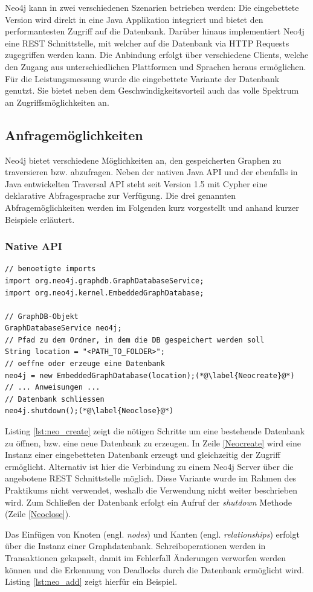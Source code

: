 \documentclass[11pt, a4paper, oneside]{article} %
\begin{document}
Neo4j kann in zwei verschiedenen Szenarien betrieben werden: Die eingebettete Version wird direkt in eine Java Applikation integriert und bietet den performantesten Zugriff auf die Datenbank. Darüber hinaus implementiert Neo4j eine REST Schnittstelle, mit welcher auf die Datenbank via HTTP Requests zugegriffen werden kann. Die Anbindung erfolgt über verschiedene Clients, welche den Zugang aus unterschiedlichen Plattformen und Sprachen heraus ermöglichen.\\
Für die Leistungsmessung wurde die eingebettete Variante der Datenbank genutzt. Sie bietet neben dem Geschwindigkeitsvorteil auch das volle Spektrum an Zugriffsmöglichkeiten an.

\subsection{Anfragemöglichkeiten}

Neo4j bietet verschiedene Möglichkeiten an, den gespeicherten Graphen zu traversieren bzw. abzufragen. Neben der nativen Java API und der ebenfalls in Java entwickelten Traversal API steht seit Version 1.5 mit Cypher eine deklarative Abfragesprache zur Verfügung. Die drei genannten Abfragemöglichkeiten werden im Folgenden kurz vorgestellt und anhand kurzer Beispiele erläutert.

\subsubsection{Native API}

\begin{lstlisting}[caption={Erstellen, Öffnen und Schließen einer Datenbank},label={lst:neo_create}]
// benoetigte imports
import org.neo4j.graphdb.GraphDatabaseService;
import org.neo4j.kernel.EmbeddedGraphDatabase;

// GraphDB-Objekt
GraphDatabaseService neo4j;
// Pfad zu dem Ordner, in dem die DB gespeichert werden soll
String location = "<PATH_TO_FOLDER>";
// oeffne oder erzeuge eine Datenbank
neo4j = new EmbeddedGraphDatabase(location);(*@\label{Neocreate}@*)
// ... Anweisungen ...
// Datenbank schliessen
neo4j.shutdown();(*@\label{Neoclose}@*)
\end{lstlisting}

Listing \ref{lst:neo_create} zeigt die nötigen Schritte um eine bestehende Datenbank zu öffnen, bzw. eine neue Datenbank zu erzeugen. In Zeile \ref{Neocreate} wird eine Instanz einer eingebetteten Datenbank erzeugt und gleichzeitig der Zugriff ermöglicht. Alternativ ist hier die Verbindung zu einem Neo4j Server über die angebotene REST Schnittstelle möglich. Diese Variante wurde im Rahmen des Praktikums nicht verwendet, weshalb die Verwendung nicht weiter beschrieben wird. Zum Schließen der Datenbank erfolgt ein Aufruf der \textit{shutdown} Methode (Zeile \ref{Neoclose}).
\par
Das Einfügen von Knoten (engl. \textit{nodes}) und Kanten (engl. \textit{relationships}) erfolgt über die Instanz einer Graphdatenbank. Schreiboperationen werden in Transaktionen gekapselt, damit im Fehlerfall Änderungen verworfen werden können und die Erkennung von Deadlocks durch die Datenbank ermöglicht wird. Listing \ref{lst:neo_add} zeigt hierfür ein Beispiel.
\end{document}
